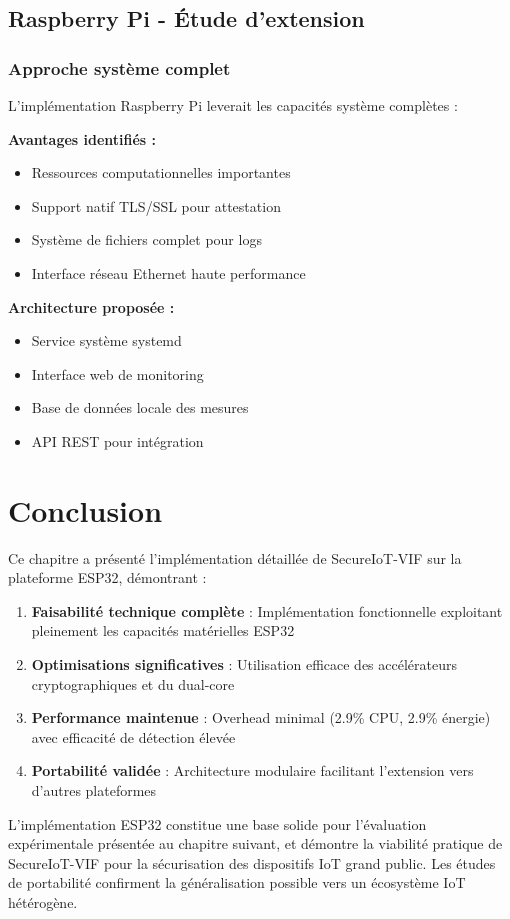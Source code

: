 \subsection{Raspberry Pi - Étude d'extension}

\subsubsection{Approche système complet}

L'implémentation Raspberry Pi leverait les capacités système complètes :

\textbf{Avantages identifiés :}
\begin{itemize}
    \item Ressources computationnelles importantes
    \item Support natif TLS/SSL pour attestation
    \item Système de fichiers complet pour logs
    \item Interface réseau Ethernet haute performance
\end{itemize}

\textbf{Architecture proposée :}
\begin{itemize}
    \item Service système systemd
    \item Interface web de monitoring
    \item Base de données locale des mesures
    \item API REST pour intégration
\end{itemize}

\section{Conclusion}

Ce chapitre a présenté l'implémentation détaillée de SecureIoT-VIF sur la plateforme ESP32, démontrant :

\begin{enumerate}
    \item \textbf{Faisabilité technique complète} : Implémentation fonctionnelle exploitant pleinement les capacités matérielles ESP32
    \item \textbf{Optimisations significatives} : Utilisation efficace des accélérateurs cryptographiques et du dual-core
    \item \textbf{Performance maintenue} : Overhead minimal (2.9\% CPU, 2.9\% énergie) avec efficacité de détection élevée
    \item \textbf{Portabilité validée} : Architecture modulaire facilitant l'extension vers d'autres plateformes
\end{enumerate}

L'implémentation ESP32 constitue une base solide pour l'évaluation expérimentale présentée au chapitre suivant, et démontre la viabilité pratique de SecureIoT-VIF pour la sécurisation des dispositifs IoT grand public. Les études de portabilité confirment la généralisation possible vers un écosystème IoT hétérogène.
